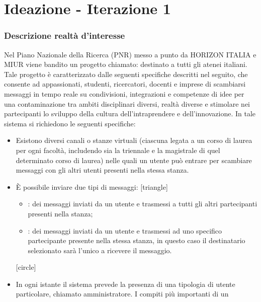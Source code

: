 \section{Ideazione - Iterazione 1}
 \begin{frame}[allowframebreaks] 
  \frametitle {Descrizione realtà d'interesse} 
   Nel Piano Nazionale della Ricerca (PNR)  messo a punto da HORIZON ITALIA e MIUR viene bandito un progetto chiamato:\newline
   \textbf{} destinato a tutti gli atenei italiani.\newline 
   Tale progetto è caratterizzato dalle seguenti specifiche descritti nel seguito, che consente ad appassionati, studenti,    
   ricercatori, docenti e imprese di scambiarsi messaggi in tempo reale su condivisioni, integrazioni e competenze di idee per una contaminazione tra ambiti 
   disciplinari diversi, realtà diverse e stimolare nei partecipanti lo sviluppo della  cultura dell’intraprendere e dell’innovazione.\newline 
   In tale sistema si richiedono le seguenti specifiche:
   \begin{itemize} 
    \item Esistono diversi canali o stanze virtuali (ciascuna legata a un corso di laurea per ogni facoltà, includendo sia la triennale e la magistrale di quel 
          determinato corso di laurea) nelle quali un utente può entrare per scambiare messaggi con gli altri utenti presenti nella stessa stanza.
    \item \`E possibile inviare due tipi di messaggi: 
          [triangle]
          \begin{itemize} 
            \item {}: dei messaggi inviati da un utente e trasmessi a tutti gli altri partecipanti presenti nella stanza; 
            \item {}: dei messaggi inviati da un utente e trasmessi ad uno specifico partecipante presente nella stessa stanza, in questo caso il 
                                        destinatario selezionato sarà l’unico a ricevere il messaggio.
          \end{itemize}
          [circle]
    \item In ogni istante il sistema prevede la presenza di una tipologia di utente particolare, chiamato amministratore. I compiti più importanti di un 

\end{itemize}
\end{frame}
